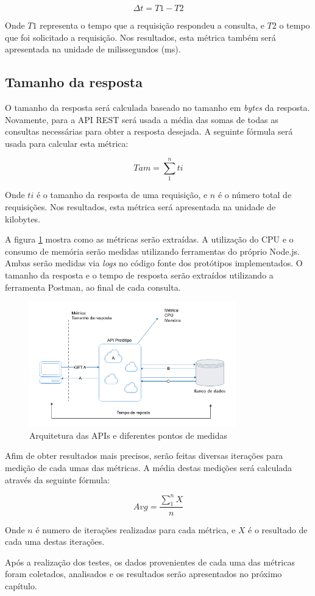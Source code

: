 $$ \Delta t = T1 - T2 $$

Onde $T1$ representa o tempo que a requisição respondeu a consulta, e $T2$ o tempo que foi solicitado a requisição. Nos resultados, esta métrica também será apresentada na unidade de milissegundos (ms).

\subsection*{Tamanho da resposta}

O tamanho da resposta será calculada baseado no tamanho em \textit{bytes} da resposta. Novamente, para a API REST será usada a média das somas de todas as consultas necessárias para obter a resposta desejada. A seguinte fórmula será usada para calcular esta métrica: 

$$ Tam = \sum\limits_{1}^{n} ti $$

Onde $ti$ é o tamanho da resposta de uma requisição, e $n$ é o número total de requisições. Nos resultados, esta métrica será apresentada na unidade de kilobytes.

A figura \ref{fig:my-metrics} mostra como as métricas serão extraídas. A utilização do CPU e o consumo de memória serão medidas utilizando ferramentas do próprio Node.js. Ambas serão medidas via \textit{logs} no código fonte dos protótipos implementados. O tamanho da resposta e o tempo de resposta serão extraídos utilizando a ferramenta Postman, ao final de cada consulta.

\begin{figure}[htbp]
\centering
\includegraphics[width=0.8\textwidth]{figuras/metricas.png}
\caption{Arquitetura das APIs e diferentes pontos de medidas}
\label{fig:my-metrics}
\end{figure}

Afim de obter resultados mais precisos, serão feitas diversas iterações para medição de cada umas das métricas. A média destas medições será calculada através da seguinte fórmula: 

$$ Avg = \frac{\sum\limits_{1}^{n} X}{n} $$

Onde $n$ é numero de iterações realizadas para cada métrica, e $X$ é o resultado de cada uma destas iterações.

Após a realização dos testes, os dados provenientes de cada uma das métricas foram coletados, analisados e os resultados serão apresentados no próximo capítulo. 